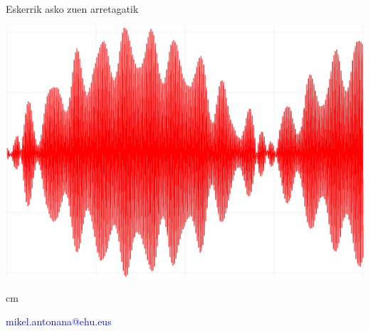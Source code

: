 \documentclass[
 10pt,%
 compress,%
 t,       %
 xcolor=svgnames
]{beamer}
\theoremstyle{definition} \newtheorem{definicion}{Definicion}[section]
\theoremstyle{propiedades} \newtheorem{propiedades}{Propiedades}[section]
\begin{document}
\begin{frame}

\bigskip
	

	

\hspace*{2.cm} \Large \color{black}Eskerrik asko zuen arretagatik
\vskip 0.4cm

\begin{center}
         \includegraphics[width=.4\textwidth]{11-Semi-Axis-Earth}
\end{center} 



 cm





\centering \large \textcolor{blue}{mikel.antonana@ehu.eus}


\small





\end{frame}


%
\end{document}
